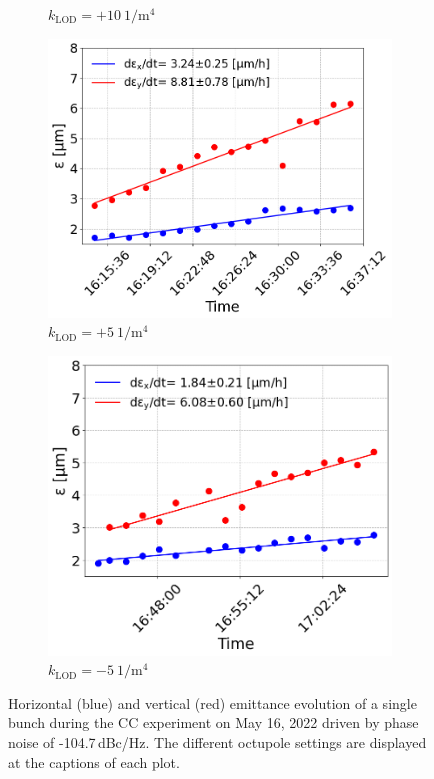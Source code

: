 \begin{figure}[htp]
\begin{subfigure}{.45\textwidth}
       \caption{$k_\mathrm{LOD}=+10 \ \mathrm{1/m^{4}}$}
       \label{fig:cc_md_2022_coast7}
   \end{subfigure}
   \begin{subfigure}{.45\textwidth}
       \centering
       \includegraphics[width=.95\linewidth]{images/Ch8/emit_vs_time_Set1_coast8.png}  
       \caption{$k_\mathrm{LOD}=+5 \ \mathrm{1/m^{4}}$}
       \label{fig:cc_md_2022_coast8}
   \end{subfigure}
   \begin{subfigure}{.45\textwidth}
           \centering
           \includegraphics[width=.95\linewidth]{images/Ch8/emit_vs_time_Set1_coast9.png}  
           \caption{$k_\mathrm{LOD}=-5 \ \mathrm{1/m^{4}}$}
           \label{fig:cc_md_2022_coast9}
   \end{subfigure}
   \caption{Horizontal (blue) and vertical (red) emittance evolution of a single bunch during the CC experiment on May 16, 2022 driven by phase noise of -104.7\,dBc/Hz. The different octupole settings are displayed at the captions of each plot.}
   \label{fig:cc_md_2022_overview_plots_klod_scan}
\end{figure}

